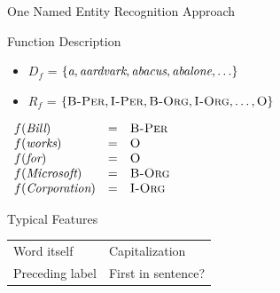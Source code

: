 \documentclass[12pt]{beamer}
\newcommand{\SC}[1]{\mbox{\sc#1}}
\newcommand{\EM}[1]{\mbox{\em#1}}
\begin{document}
\begin{frame}{One Named Entity Recognition Approach}
	\begin{block}{Function Description}
		\begin{itemize}
			\item $D_f$ = \pause $\{\EM{a},\EM{aardvark},\EM{abacus},\EM{abalone},\ldots\}$
			\item $R_f$ = \pause $\{\SC{B-Per},\SC{I-Per},\SC{B-Org},\SC{I-Org},\ldots,\SC{O}\}$
		\end{itemize}
	\end{block}
	\pause
	$
	\begin{array}{lll}
		f(\EM{Bill})        & = & \SC{B-Per} \\
		f(\EM{works})       & = & \SC{O} \\
		f(\EM{for})         & = & \SC{O} \\
		f(\EM{Microsoft})   & = & \SC{B-Org} \\
		f(\EM{Corporation}) & = & \SC{I-Org} \\
	\end{array}
	$
	\pause
	\begin{block}{Typical Features}
		\begin{tabular}{p{1.8in}p{1.8in}}
			Word itself     & Capitalization \\
			Preceding label & First in sentence? \\
		\end{tabular}
	\end{block}
\end{frame}
\end{document}
